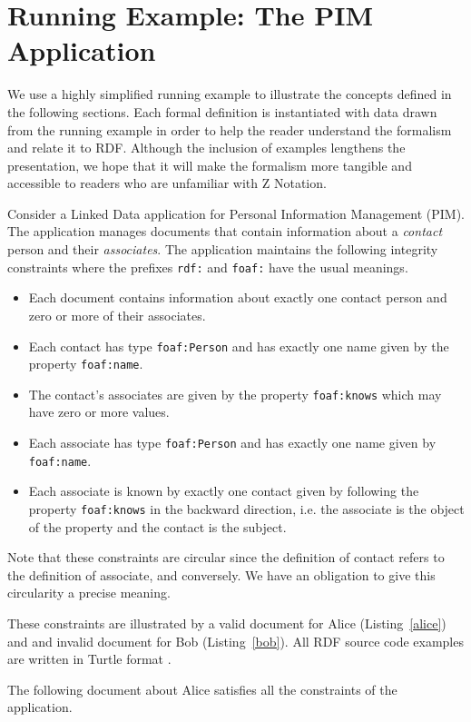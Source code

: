 \documentclass{article}
\begin{document}
\section{Running Example: The PIM Application}
\label{sec-pim}
We use a highly simplified running example to illustrate the concepts defined in the following sections.
Each formal definition is instantiated with data drawn from the running example in order to help the reader understand the
formalism and relate it to RDF.
Although the inclusion of examples lengthens the presentation, we hope that it will make the formalism more tangible and accessible
to readers who are unfamiliar with Z Notation.

Consider a Linked Data \cite{tbl:ld} application for Personal Information Management (PIM).
The application manages documents that contain information about a {\em contact} person and their {\em associates}.
\cbstart
The application maintains the following integrity constraints where the
prefixes {\tt rdf:}\cite{w3c:rdf11} and {\tt foaf:}\cite{foaf:spec} have the usual meanings.
\cbend
\begin{itemize}
\item Each document contains information about exactly one contact person and zero or more of their associates.
\item Each contact has type {\tt foaf:Person} and has exactly one name given by the property {\tt foaf:name}.
\item The contact's associates are given by the property {\tt foaf:knows} which may have zero or more values.
\item Each associate has type {\tt foaf:Person} and has exactly one name given by {\tt foaf:name}.
\item Each associate is known by exactly one contact given by following the property {\tt foaf:knows} in the backward direction, i.e. the associate is the object of the property and the contact is the subject.
\end{itemize}

Note that these constraints are circular since the definition of contact refers to the definition of associate, and conversely.
We have an obligation to give this circularity a precise meaning.

These constraints are illustrated by a valid document for Alice (Listing~\ref{alice}) and and invalid document for Bob (Listing~\ref{bob}).
All RDF source code examples are written in Turtle format \cite{w3c:turtle11}.

The following document about Alice satisfies all the constraints of the application.

\end{document}
